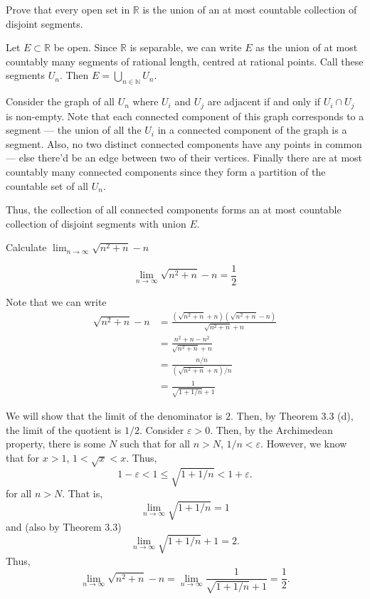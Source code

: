 \documentclass[12 pt, letterpaper]{hmcpset}
\begin{document}
\pagebreak

\begin{problem}
	Prove that every open set in $\mathbb{R}$ is the union of an at most countable collection of disjoint segments.
\end{problem}

\begin{solution}
	Let $E \subset \mathbb{R}$ be open. Since $\mathbb{R}$ is separable, we can write $E$ as the union of at most countably many segments of rational length, centred at rational points. Call these segments $U_{n}$. Then $E = \bigcup_{n \in \mathbb{N}} U_{n}$.

	Consider the graph of all $U_{n}$ where $U_{i}$ and $U_{j}$ are adjacent if and only if $U_{i} \cap U_{j}$ is non-empty. Note that each connected component of this graph corresponds to a segment --- the union of all the $U_{i}$ in a connected component of the graph is a segment. Also, no two distinct connected components have any points in common --- else there'd be an edge between two of their vertices. Finally there are at most countably many connected components since they form a partition of the countable set of all $U_{n}$.

	Thus, the collection of all connected components forms an at most countable collection of disjoint segments with union $E$.
\end{solution}

\pagebreak

\begin{problem}
	Calculate $\lim_{n \to \infty} \sqrt{n^{2} + n} - n$
\end{problem}

\begin{solution}
	 \[
	 	\boxed{
			\lim_{n \to \infty} \sqrt{n^{2} + n} - n = \frac{1}{2}
		}
	 \]

	 Note that we can write
	 \[
		 \begin{split}
			 \sqrt{n^{2} + n} - n & = \frac{(\sqrt{n^{2} + n} + n)(\sqrt{n^{2} + n} - n)}{\sqrt{n^{2} + n} + n} \\
					      & = \frac{n^{2} + n - n^{2}}{\sqrt{n^{2} + n} + n} \\
					      & = \frac{n/n}{(\sqrt{n^{2} + n} + n)/n} \\
					      & = \frac{1}{\sqrt{1 + 1/n} + 1}
		 \end{split}
	 \]

	 We will show that the limit of the denominator is $2$. Then, by Theorem 3.3 (d), the limit of the quotient is $1/2$. Consider $\varepsilon > 0$. Then, by the Archimedean property, there is some $N$ such that for all $n > N$, $1/n < \varepsilon$. However, we know that for $x > 1$, $1 < \sqrt{x} < x$. Thus,
	 \[
	 	1 - \varepsilon < 1 \le \sqrt{1 + 1/n} < 1 + \varepsilon.
	 \]
	 for all $n > N$. That is,
	 \[
	 	\lim_{n \to \infty} \sqrt{1 + 1/n} = 1
	 \]
	 and (also by Theorem 3.3)
	 \[
	 	\lim_{n \to \infty} \sqrt{1 + 1/n} + 1 = 2.
	 \]
	 Thus,
	 \[
	 	\lim_{n \to \infty} \sqrt{n^{2} + n} - n = \lim_{n \to \infty} \frac{1}{\sqrt{1 + 1/n} + 1} = \frac{1}{2}.
	 \]
\end{solution}
\end{document}
